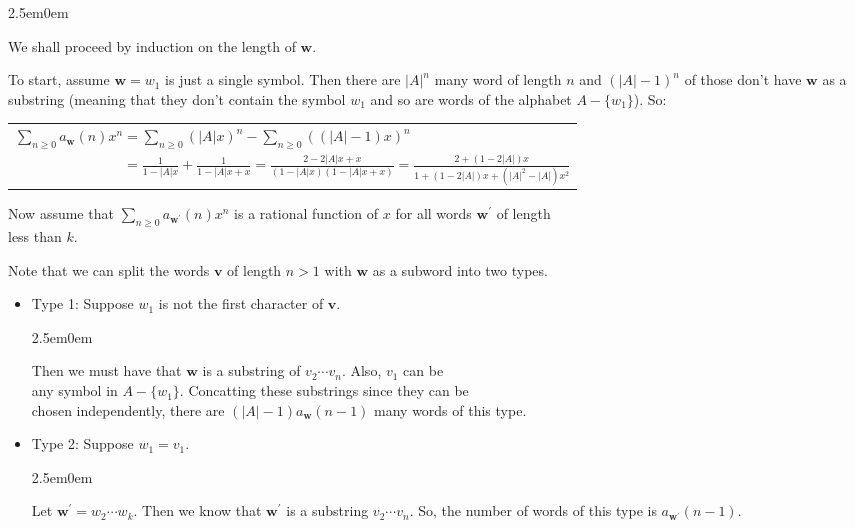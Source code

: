 \documentclass{book}
\newcommand{\exOne}{%
   \color{Purple}%
   \fontsize{13}{15}\selectfont%
}
\newenvironment{myIndent}{%
   \begin{adjustwidth}{2.5em}{0em}%
}{%
   \end{adjustwidth}%
}
\newcommand{\retTwo}{\hfill\bigbreak}
\begin{document}
\begin{myIndent}\exOne
   We shall proceed by induction on the length of $\bm{w}$.\retTwo

   To start, assume $\bm{w} = w_1$ is just a single symbol. Then there are $|A|^n$ many word of length $n$ and $(|A| - 1)^n$ of those don't have $\bm{w}$ as a substring (meaning that they don't contain the symbol $w_1$ and so are words of the alphabet $A - \{w_1\}$). So:\\ [-9pt]

   {\center 
   \begin{tabular}{l}
      $\sum\limits_{n \geq 0}a_{\bm{w}}(n)x^n = \sum\limits_{n \geq 0}(|A|x)^n - \sum\limits_{n \geq 0}((|A| - 1)x)^n$\\ [12pt]
      $\phantom{\sum\limits_{n \geq 0}a_{\bm{w}}(n)x^n} = \frac{1}{1 - |A|x} + \frac{1}{1 - |A|x + x} = \frac{2 - 2|A|x + x}{(1 - |A|x)(1 - |A|x + x)} = \frac{2 + (1 - 2|A|)x}{1 + (1 - 2|A|)x+ (|A|^2 - |A|)x^2}$
   \end{tabular} \retTwo\par}

   Now assume that $\sum\limits_{n \geq 0}a_{\bm{w}^\prime}(n)x^n$ is a rational function of $x$ for all words $\bm{w}^\prime$ of length\\ [-8pt] less than $k$.\retTwo

   Note that we can split the words $\bm{v}$ of length $n > 1$ with $\bm{w}$ as a subword into two types.
   \begin{itemize}
      \item Type 1: Suppose $w_1$ is not the first character of $\bm{v}$.
      
      \begin{myIndent}
         Then we must have that $\bm{w}$ is a substring of $v_2\cdots v_n$. Also, $v_1$ can be\\ any symbol in $A - \{w_1\}$. Concatting these substrings since they can be\\ chosen independently, there are $(|A| - 1)a_{\bm{w}}(n - 1)$ many words of this type.
      \end{myIndent}

      \item Type 2: Suppose $w_1 = v_1$.
      \begin{myIndent}
         Let $\bm{w}^\prime = w_2\cdots w_k$. Then we know that $\bm{w}^\prime$ is a substring $v_2 \cdots v_n$. So, the number of words of this type is $a_{\bm{w}^\prime}(n - 1)$.\retTwo
      \end{myIndent}
   \end{itemize}


\end{myIndent}
\end{document}
